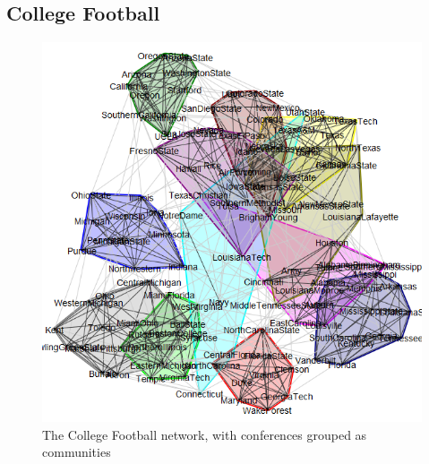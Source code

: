 \subsection{College Football}

\cite{Girvan2002}
\begin{figure}[!htb]
	\begin{center}
		\includegraphics[scale=.4]{images/football.png}
	\end{center}
	\caption{The College Football network, with conferences grouped as communities}
	\label{logo}
\end{figure}


